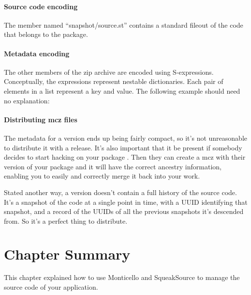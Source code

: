 \documentclass[a4paper,10pt,twoside]{book}
\begin{document}
\paragraph{Source code encoding}

The member named ``snapshot/source.st'' contains a standard fileout of the code that belongs to the package.

\paragraph{Metadata encoding}

The other members of the zip archive are encoded using S-expressions. Conceptually, the expressions represent nestable dictionaries. Each pair of elements in a list represent a key and value. The following example should need no explanation:


\paragraph{Distributing mcz files}

The metadata for a version ends up being fairly compact, so it's not unreasonable to distribute it with a release. It's also important that it be present if somebody decides to start hacking on your package . Then they can create a mcz with their version of your package and it will have the correct ancestry information, enabling you to easily and correctly merge it back into your work.

Stated another way, a version doesn't contain a full history of the source code. It's a snapshot of the code at a single point in time, with a UUID identifying that snapshot, and a record of the UUIDs of all the previous snapshots it's descended from. So it's a perfect thing to distribute.

\section{Chapter Summary}

This chapter explained how to use Monticello and SqueakSource to manage the source code of your application.
\end{document}
